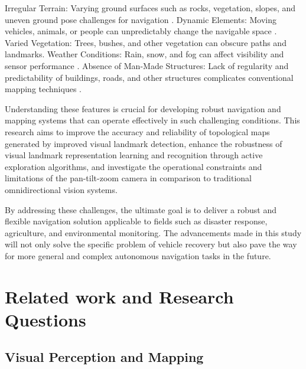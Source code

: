 \documentclass[runningheads]{llncs}
\begin{document}
    Irregular Terrain: Varying ground surfaces such as rocks, vegetation, slopes, and uneven ground pose challenges for navigation \cite{Navigation_Large_Unstructured_environments}.
    Dynamic Elements: Moving vehicles, animals, or people can unpredictably change the navigable space \cite{LocalizabilityPathPlanning}.
    Varied Vegetation: Trees, bushes, and other vegetation can obscure paths and landmarks.
    Weather Conditions: Rain, snow, and fog can affect visibility and sensor performance \cite{LocalizabilityPathPlanning}.
    Absence of Man-Made Structures: Lack of regularity and predictability of buildings, roads, and other structures complicates conventional mapping techniques \cite{LandmarksEffectivenessExperiment}.

Understanding these features is crucial for developing robust navigation and mapping systems that can operate effectively in such challenging conditions. This research aims to improve the accuracy and reliability of topological maps generated by improved visual landmark detection, enhance the robustness of visual landmark representation learning and recognition through active exploration algorithms, and investigate the operational constraints and limitations of the pan-tilt-zoom camera in comparison to traditional omnidirectional vision systems.

By addressing these challenges, the ultimate goal is to deliver a robust and flexible navigation solution applicable to fields such as disaster response, agriculture, and environmental monitoring. The advancements made in this study will not only solve the specific problem of vehicle recovery but also pave the way for more general and complex autonomous navigation tasks in the future.


\section{Related work and Research Questions}

\subsection{Visual Perception and Mapping}

\end{document}
